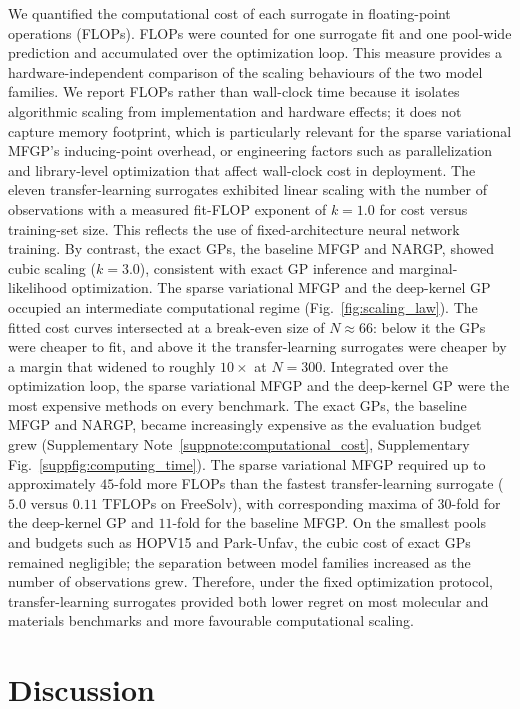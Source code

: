 \documentclass[11pt,a4paper]{article}%
\begin{document}
We quantified the computational cost of each surrogate in floating-point operations (FLOPs). FLOPs were counted for one surrogate fit and one pool-wide prediction and accumulated over the
optimization loop. This measure provides a hardware-independent
comparison of the scaling behaviours of the two model families. We report FLOPs rather than wall-clock time because it isolates algorithmic scaling from implementation and hardware effects; it does not capture memory footprint, which is particularly relevant for the sparse variational MFGP's inducing-point overhead, or engineering factors such as parallelization and library-level optimization that affect wall-clock cost in deployment.  The
eleven transfer-learning surrogates exhibited linear scaling with the number of observations with a measured
fit-FLOP exponent of $k = 1.0$ for cost versus training-set size. This reflects the use of fixed-architecture
neural network training. By contrast, the exact GPs, the baseline MFGP and NARGP, showed cubic scaling
($k = 3.0$), consistent with exact GP inference and marginal-likelihood optimization. 
The sparse variational MFGP and the deep-kernel GP occupied an intermediate computational regime (Fig.~\ref{fig:scaling_law}). The fitted cost curves intersected at a break-even size of $N \approx 66$: below it the
GPs were cheaper to fit, and above it the transfer-learning surrogates were cheaper by a margin that widened to roughly $10\times$ at $N = 300$.
Integrated over the optimization loop, the sparse variational MFGP
and the deep-kernel GP were the most expensive methods on every benchmark.
The exact GPs, the baseline MFGP and NARGP, became increasingly expensive as the evaluation
budget grew (Supplementary Note~\ref{suppnote:computational_cost}, Supplementary
Fig.~\ref{suppfig:computing_time}). The sparse variational MFGP required up to
approximately $45$-fold more FLOPs than the fastest transfer-learning surrogate ($5.0$ versus $0.11$ TFLOPs on FreeSolv), with corresponding maxima of $30$-fold for the deep-kernel GP and $11$-fold for the baseline MFGP. On the smallest pools and budgets such as HOPV15 and Park-Unfav, the cubic cost of exact GPs remained negligible; the separation between model families increased as the number of observations grew. Therefore, under the fixed optimization protocol, 
 transfer-learning surrogates provided both lower regret on most molecular and materials benchmarks and more favourable computational scaling.

\section{Discussion}\label{sec:discussion}
\end{document}

